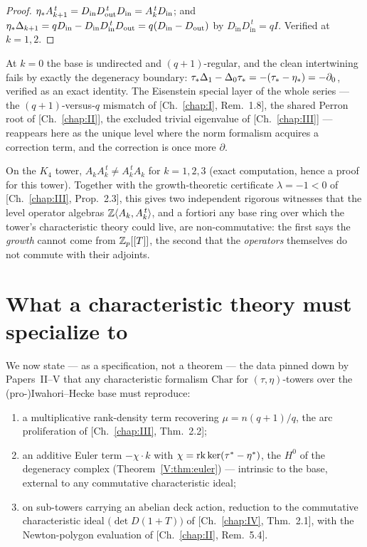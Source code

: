\begin{proof}
$\eta_* A_{k+1}^{\,t}=D_{\mathrm{in}}D_{\mathrm{out}}^{\,t}D_{\mathrm{in}}
=A_k^{\,t}D_{\mathrm{in}}$; and
$\eta_*\Delta_{k+1}=qD_{\mathrm{in}}-D_{\mathrm{in}}D_{\mathrm{in}}^{\,t}D_{\mathrm{out}}
=q(D_{\mathrm{in}}-D_{\mathrm{out}})$ by
$D_{\mathrm{in}}D_{\mathrm{in}}^{\,t}=qI$. Verified at $k=1,2$.
\end{proof}

\begin{remark}\label{V:rem:level0}
At $k=0$ the base is undirected and $(q+1)$-regular, and the clean intertwining fails
by exactly the degeneracy boundary:
$\tau_*\Delta_1-\Delta_0\tau_*=-(\tau_*-\eta_*)=-\partial_0$, verified as an exact identity. The
Eisenstein special layer of the whole series --- the $(q+1)$-versus-$q$ mismatch of
[Ch.~\ref{chap:I}, Rem.~1.8], the shared Perron root of [Ch.~\ref{chap:II}], the excluded trivial eigenvalue of
[Ch.~\ref{chap:III}] --- reappears here as the unique level where the norm formalism acquires a
correction term, and the correction is once more $\partial$.
\end{remark}

\begin{proposition}\label{V:prop:nonnormal}
On the $K_4$ tower, $A_kA_k^{\,t}\neq A_k^{\,t}A_k$ for $k=1,2,3$ (exact
computation, hence a proof for this tower). Together with the growth-theoretic
certificate $\lambda=-1<0$ of {\rm[Ch.~\ref{chap:III}, Prop.~2.3]}, this gives two independent
rigorous witnesses that the level operator algebras
$\mathbb{Z}\langle A_k,A_k^{\,t}\rangle$, and a fortiori any base ring over which the tower's
characteristic theory could live, are non-commutative: the first says the
\emph{growth} cannot come from $\mathbb{Z}_p[[T]]$, the second that the \emph{operators}
themselves do not commute with their adjoints.
\end{proposition}

\section{What a characteristic theory must specialize to}\label{V:sec:axioms}

We now state --- as a specification, not a theorem --- the data pinned down by
Papers~II--V that any characteristic formalism $\mathrm{Char}$ for
$(\tau,\eta)$-towers over the (pro-)Iwahori--Hecke base must reproduce:
\begin{enumerate}
\item[(A1)] a multiplicative rank-density term recovering $\mu=n(q+1)/q$, the arc
proliferation of {\rm[Ch.~\ref{chap:III}, Thm.~2.2]};
\item[(A2)] an additive Euler term $-\chi\cdot k$ with
$\chi=\operatorname{rk}\ker(\tau^*-\eta^*)$, the $H^0$ of the degeneracy complex
(Theorem~\ref{V:thm:euler}) --- intrinsic to the base, external to any commutative
characteristic ideal;
\item[(A3)] on sub-towers carrying an abelian deck action, reduction to the
commutative characteristic ideal $\bigl(\det D(1+T)\bigr)$ of {\rm[Ch.~\ref{chap:IV}, Thm.~2.1]},
with the Newton-polygon evaluation of {\rm[Ch.~\ref{chap:II}, Rem.~5.4]}.
\end{enumerate}

